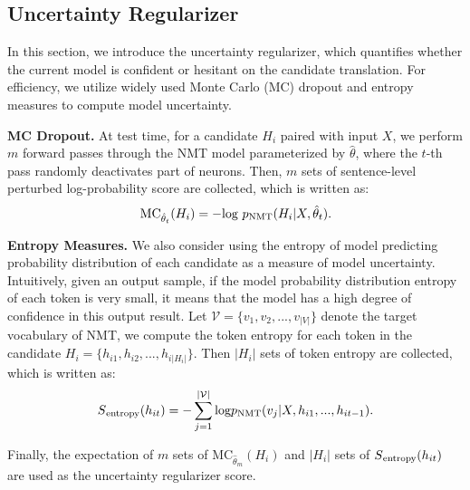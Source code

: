 \documentclass{article}
\begin{document}
\subsection{Uncertainty Regularizer}\label{sec:UR}
In this section, we introduce the uncertainty regularizer, which quantifies whether the current model is confident or hesitant on the candidate translation. For efficiency, we utilize widely used Monte Carlo (MC) dropout and entropy measures to compute model uncertainty.

\noindent\textbf{MC Dropout.} At test time, for a candidate $H_i$ paired with input $X$, we perform $m$ forward passes through the NMT model parameterized by $\hat{\theta}$, where the $t$-th pass randomly deactivates part of neurons. Then, $m$ sets of sentence-level perturbed log-probability score are collected, which is written as:
\begin{equation}
\text{MC}_{\hat{\theta}_t}(H_i)=-\text{log }p\textsubscript{NMT}(H_i|X,\hat{\theta}_t).
\end{equation}


\noindent\textbf{Entropy Measures.} We also consider using the entropy of model predicting probability distribution of each candidate as a measure of model uncertainty. Intuitively, given an output sample, if the model probability distribution entropy of each token is very small, it means that the model has a high degree of confidence in this output result. Let $\mathcal{V}=\{v_1,v_2,...,v_{|V|}\}$ denote the target vocabulary of NMT, we compute the token entropy for each token in the candidate $H_i=\{h_{i1},h_{i2},...,h_{i|H_i|}\}$. Then $|H_i|$ sets of token entropy are collected, which is written as:
\begin{equation}
S\textsubscript{entropy}(h_{it})=-\sum_{j=1}^{|\mathcal{V}|}\text{log}p\textsubscript{NMT}(v_j|X,h_{i1}, ..., h_{it-1}).
\end{equation}

Finally, the expectation of $m$ sets of $\text{MC}_{\hat{\theta}_m}(H_i)$ and $|H_i|$ sets of $S\textsubscript{entropy}(h_{it})$ are used as the uncertainty regularizer score.
\end{document}
